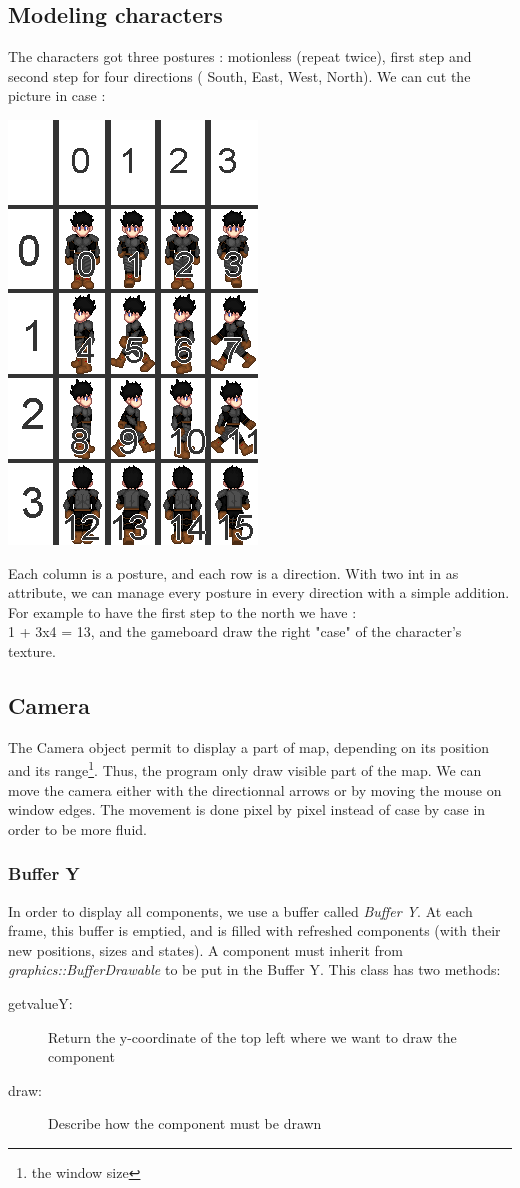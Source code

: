 \documentclass{scrreprt}
\begin{document}
	\subsection{Modeling characters}
	The characters got three postures : motionless (repeat twice), first step and second step for four directions ( South, East, West, North). We can cut the picture in case : 
	\begin{center}
	\includegraphics[scale=0.4]{char.png}
	\end{center}
	Each column is a posture, and each row is a direction. With two int in as attribute, we can manage every posture in every direction with a simple addition. For example to have the first step to the north we have :\\
	1 + 3x4 = 13, and the gameboard draw the right "case" of the character's texture.
	\subsection{Camera}
	The Camera object permit to display a part of map, depending on its position and its range\footnote{the window size}. Thus, the program only draw visible part of the map. We can move the camera either with the directionnal arrows or by moving the mouse on window edges. The movement is done pixel by pixel instead of case by case in order to be more fluid.

	\subsubsection{Buffer Y}
	In order to display all components, we use a buffer called \emph{Buffer Y}. At each frame, this buffer is emptied, and is filled with refreshed components (with their new positions, sizes and states). A component must inherit from \emph{graphics::BufferDrawable} to be put in the Buffer Y. This class has two methods:
		\begin{description}
		\item[getvalueY:]{Return the y-coordinate of the top left where we want to draw the component}
		\item[draw:]{Describe how the component must be drawn}
		\end{description}
\end{document}
